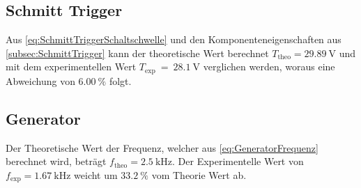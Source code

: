 \begin{table}
    \centering
    \caption{Messdaten zum Differenzierer.}
    \label{tab:Differenzierer}
\end{table}

\subsection{Schmitt Trigger}
Aus \autoref{eq:SchmittTriggerSchaltschwelle} und den Komponenteneigenschaften aus \autoref{subsec:SchmittTrigger} 
kann der theoretische Wert berechnet $T_\text{theo} = \qty{29.89}{\volt}$ und mit dem experimentellen Wert $T_\text{exp}~=~\qty{28.1}{\volt}$
verglichen werden, woraus eine Abweichung von $\qty{6.00}{\percent}$ folgt. 

\subsection{Generator}
Der Theoretische Wert der Frequenz, welcher aus \autoref{eq:GeneratorFrequenz} berechnet wird, beträgt $f_\text{theo} = \qty{2.5}{\kilo\hertz}$.
Der Experimentelle Wert von $f_\text{exp} = \qty{1.67}{\kilo\hertz}$ weicht um $\qty{33.2}{\percent}$ vom Theorie Wert ab.

